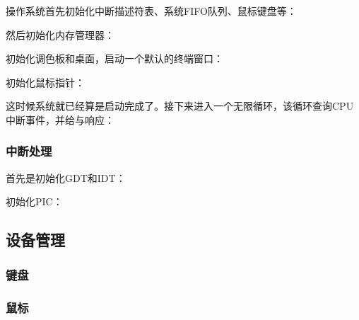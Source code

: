 
操作系统首先初始化中断描述符表、系统FIFO队列、鼠标键盘等：
{\linespread{1}}

然后初始化内存管理器：
{\linespread{1}}

初始化调色板和桌面，启动一个默认的终端窗口：
{\linespread{1}}

初始化鼠标指针：
{\linespread{1}}

这时候系统就已经算是启动完成了。接下来进入一个无限循环，该循环查询CPU中断事件，并给与响应：
{\linespread{1}}

\subsubsection{中断处理}
\label{subs:中断处理}

首先是初始化GDT和IDT：
{\linespread{1}}

初始化PIC：
{\linespread{1}}

\subsection{设备管理}
\label{sub:设备管理}

\subsubsection{键盘}
\label{subs:键盘}

{\linespread{1}}
{\linespread{1}}

\subsubsection{鼠标}
\label{subs:鼠标}

{\linespread{1}}

